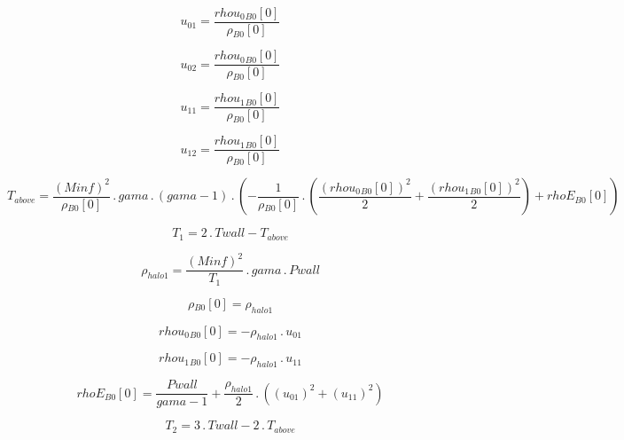 \documentclass{article}
\begin{document}
\begin{dmath}u_{01} = \frac{{rhou_{0}{_{B0}}}[{0}]}{{\rho{_{B0}}}[{0}]}\end{dmath}

\begin{dmath}u_{02} = \frac{{rhou_{0}{_{B0}}}[{0}]}{{\rho{_{B0}}}[{0}]}\end{dmath}

\begin{dmath}u_{11} = \frac{{rhou_{1}{_{B0}}}[{0}]}{{\rho{_{B0}}}[{0}]}\end{dmath}

\begin{dmath}u_{12} = \frac{{rhou_{1}{_{B0}}}[{0}]}{{\rho{_{B0}}}[{0}]}\end{dmath}

\begin{dmath}T_{above} = \frac{\left(Minf \right)^{2}}{{\rho{_{B0}}}[{0}]} \,.\, gama \,.\, \left(gama - 1\right) \,.\, \left(- \frac{1}{{\rho{_{B0}}}[{0}]} \,.\, \left(\frac{\left({rhou_{0}{_{B0}}}[{0}] \right)^{2}}{2} + 
\frac{\left({rhou_{1}{_{B0}}}[{0}] \right)^{2}}{2}\right) + {rhoE{_{B0}}}[{0}]\right)\end{dmath}

\begin{dmath}T_{1} = 2 \,.\, Twall - T_{above}\end{dmath}

\begin{dmath}\rho_{halo 1} = \frac{\left(Minf \right)^{2}}{T_{1}} \,.\, gama \,.\, Pwall\end{dmath}

\begin{dmath}{\rho{_{B0}}}[{0}] = \rho_{halo 1}\end{dmath}

\begin{dmath}{rhou_{0}{_{B0}}}[{0}] = - \rho_{halo 1} \,.\, u_{01}\end{dmath}

\begin{dmath}{rhou_{1}{_{B0}}}[{0}] = - \rho_{halo 1} \,.\, u_{11}\end{dmath}

\begin{dmath}{rhoE{_{B0}}}[{0}] = \frac{Pwall}{gama - 1} + \frac{\rho_{halo 1}}{2} \,.\, \left(\left(u_{01} \right)^{2} + \left(u_{11} \right)^{2}\right)\end{dmath}

\begin{dmath}T_{2} = 3 \,.\, Twall - 2 \,.\, T_{above}\end{dmath}
\end{document}
